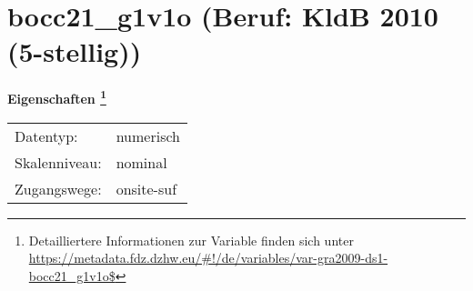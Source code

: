 
    \setcounter{footnote}{0}

    \vspace*{-1.8cm}
	\section{bocc21\_g1v1o (Beruf: KldB 2010 (5-stellig))}
	\label{section:bocc21_g1v1o}



    \vspace*{0.5cm}
    \noindent\textbf{Eigenschaften
	\footnote{Detailliertere Informationen zur Variable finden sich unter
		\url{https://metadata.fdz.dzhw.eu/\#!/de/variables/var-gra2009-ds1-bocc21_g1v1o$}}}\\
	\begin{tabularx}{\hsize}{@{}lX}
	Datentyp: & numerisch \\
	Skalenniveau: & nominal \\
	Zugangswege: &
	  onsite-suf
 \\
    \end{tabularx}



